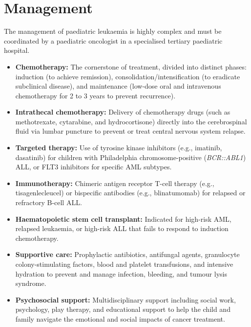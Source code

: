 \section*{Management}
The management of paediatric leukaemia is highly complex and must be coordinated by a paediatric oncologist in a specialised tertiary paediatric hospital.
\begin{itemize}
    \item \textbf{Chemotherapy:} The cornerstone of treatment, divided into distinct phases: induction (to achieve remission), consolidation/intensification (to eradicate subclinical disease), and maintenance (low-dose oral and intravenous chemotherapy for 2 to 3 years to prevent recurrence).
    \item \textbf{Intrathecal chemotherapy:} Delivery of chemotherapy drugs (such as methotrexate, cytarabine, and hydrocortisone) directly into the cerebrospinal fluid via lumbar puncture to prevent or treat central nervous system relapse.
    \item \textbf{Targeted therapy:} Use of tyrosine kinase inhibitors (e.g., imatinib, dasatinib) for children with Philadelphia chromosome-positive (\textit{BCR::ABL1}) ALL, or FLT3 inhibitors for specific AML subtypes.
    \item \textbf{Immunotherapy:} Chimeric antigen receptor T-cell therapy (e.g., tisagenlecleucel) or bispecific antibodies (e.g., blinatumomab) for relapsed or refractory B-cell ALL.
    \item \textbf{Haematopoietic stem cell transplant:} Indicated for high-risk AML, relapsed leukaemia, or high-risk ALL that fails to respond to induction chemotherapy.
    \item \textbf{Supportive care:} Prophylactic antibiotics, antifungal agents, granulocyte colony-stimulating factors, blood and platelet transfusions, and intensive hydration to prevent and manage infection, bleeding, and tumour lysis syndrome.
    \item \textbf{Psychosocial support:} Multidisciplinary support including social work, psychology, play therapy, and educational support to help the child and family navigate the emotional and social impacts of cancer treatment.
\end{itemize}

